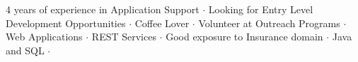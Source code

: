 

\begin{cvparagraph}
4 years of experience in Application Support ${\cdotp}$ Looking for Entry Level Development Opportunities ${\cdotp}$ Coffee Lover ${\cdotp}$ Volunteer at Outreach Programs ${\cdotp}$ Web Applications ${\cdotp}$ REST Services ${\cdotp}$ Good exposure to Insurance domain ${\cdotp}$ Java and SQL ${\cdotp}$
\end{cvparagraph}
